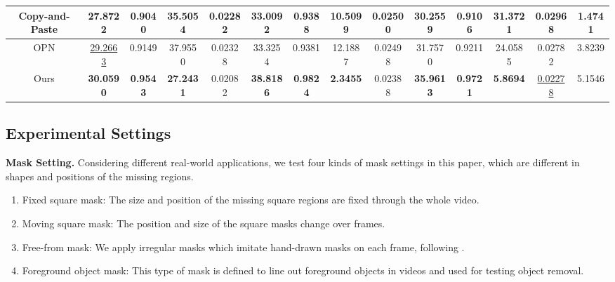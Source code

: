 \begin{table}[t]
{\begin{tabular}{c|c|c|c|c|c|c|c|c|c|c|c|c|c }
			Copy-and-Paste \cite{lee2019copy}&
			27.8722 &   0.9040 &  35.5054 & 0.02282 &
			
			33.0092 &  0.9388 &  10.5099 & 0.02500 & 
			
			30.2559 & 0.9106 & 31.3721 & 0.02968 
			& 1.4741
			\\
			
			\hline
			
			
			OPN \cite{oh2019onion} & \underline{29.2663} &0.9149 & 37.9550 &0.02328 &
			
			33.3254 & 0.9381  & 12.1887 &0.02498 &
			
			31.7570  & 0.9211 & 24.0585 
			&0.02782 &
			3.8239 \\
			
			
			\hline
			
			
			
			Ours &\textbf{30.0590} &\textbf{0.9543}&   \textbf{27.2431} & 0.02082 &
			\textbf{38.8186} & \textbf{0.9824} & \textbf{2.3455} & 0.02388 &
			\textbf{35.9613}  & \textbf{0.9721}&  \textbf{ 5.8694}  & \underline{0.02278}  &5.1546\\
			
			\hline
		\end{tabular}
	}
	\label{tab:sem}
\end{table}


\subsection{Experimental Settings}
\noindent \textbf{Mask Setting.} Considering different real-world applications, we test four kinds of mask settings in this paper, which are different in shapes and positions of the missing regions. 
\begin{enumerate}
\item Fixed square mask: The size and position of the missing square regions are fixed through the whole video. 
\item Moving square mask: The position and size of the square masks change over frames. 
\item Free-from mask: We apply irregular masks which imitate hand-drawn masks on each frame, following \cite{liu2018partialinpainting}. 
\item Foreground object mask: This type of mask is defined to line out foreground objects in videos and used for testing object removal.
\end{enumerate}

